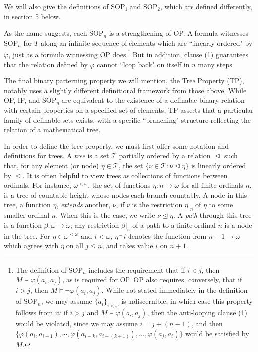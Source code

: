 \documentclass[10pt,a4paper]{amsart}
\newcommand{\calT}{\mathcal{T}}
\newcommand{\SOP}{\text{SOP}}
\newcommand{\vphi}{\varphi}
\begin{document}
We will also give the definitions of $\mathrm{SOP}_{1}$ and $\mathrm{SOP}_{2}$, which are defined differently, in section 5 below.

As the name suggests, each $\mathrm{SOP}_n$ is a strengthening
of OP. A formula witnesses $\mathrm{SOP}_n$ for $T$ along an infinite sequence of elements which are ``linearly ordered" by $\vphi$, just as a formula witnessing OP does.\footnote{The definition of $\mathrm{SOP}_{n}$ includes the requirement that if $i<j$, then $M\models\vphi(a_i,a_j)$, as is required for OP. OP also requires, conversely, that if $i>j$, then $M\models \neg \vphi(a_i,a_j)$. While not stated immediately in the definition of $\SOP_n$, we may assume $\{a_{i}\}_{i < \omega}$ is indiscernible, in which case this property follows from it: if $i>j$ and $M\models \vphi(a_i,a_j)$, then the anti-looping clause (1) would be violated, since we may assume $i = j + (n-1)$, and then $\{\vphi(a_i,a_{i -1}), \dotsm, \vphi(a_{i- k},a_{i - (k + 1)}), \ldots, \vphi(a_j,a_i)\}$ would be satisfied by $M$.} But in addition, clause (1) guarantees that the relation defined by $\vphi$ cannot ``loop back" on itself in $n$ many steps.

The final binary patterning property we will mention, the Tree Property (TP), notably uses a slightly different definitional framework from those above. While OP, IP, and $\mathrm{SOP}_n$ are equivalent to the existence of a definable binary relation with certain properties on a specified set of elements, TP asserts that a particular family of definable sets exists, with a specific ``branching" structure reflecting the relation of a mathematical tree.

In order to define the tree property, we must first offer some notation and definitions for trees. A \textit{tree} is a set $\calT$ partially ordered by a relation $\trianglelefteq$ such that, for any element (or node) $\eta\in \calT$, the set $\{\nu\in \calT\colon \nu\trianglelefteq\eta\}$ is linearly ordered by $\trianglelefteq$. It is often helpful to view trees as collections of functions between ordinals. For instance, $\omega^{<\omega}$, the set of functions $\eta\colon n\to\omega$ for all finite ordinals $n$, is a tree of countable height whose nodes each branch countably. A node in this tree, a function $\eta$, \textit{extends} another, $\nu$, if $\nu$ is the restriction $\eta|_n$ of $\eta$ to some smaller ordinal $n$. When this is the case, we write $\nu\trianglelefteq\eta$. A \textit{path} through this tree is a function $\beta\colon \omega\to\omega$; any restriction $\beta|_n$ of a path to a finite ordinal $n$ is a node in the tree. For $\eta\in \omega^{<\omega}$ and $i<\omega$, $\eta^\smallfrown i$ denotes the function from $n+1\to \omega$ which agrees with $\eta$ on all $j\leq n$, and takes value $i$ on $n+1$.
\end{document}
